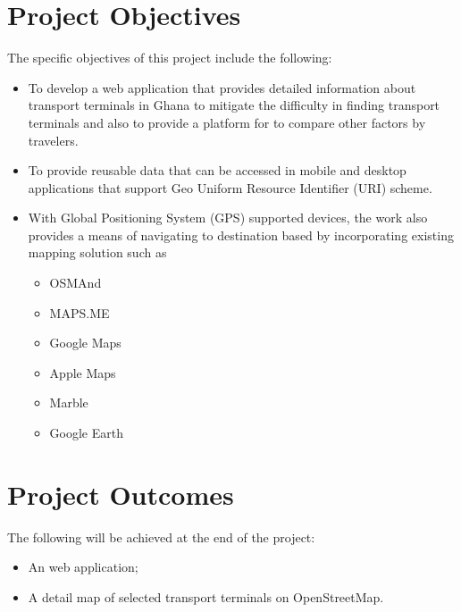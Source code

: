 \section{Project Objectives}
The specific objectives of this project include the following:
\begin{itemize}
	\item To develop a web application that provides detailed information about transport terminals in Ghana to mitigate the difficulty in finding transport terminals and also to provide a platform for to compare other factors by travelers.
		\item To provide reusable data that can be accessed in mobile and desktop applications that support Geo Uniform Resource Identifier (URI) scheme.
		\item With Global Positioning System (GPS) supported devices, the work also provides a means of navigating to destination based by incorporating existing mapping solution such as
	    \begin{itemize}[label=$\circ$]
		\item OSMAnd
		\item MAPS.ME
		\item Google Maps
		\item Apple Maps
		\item Marble
		\item Google Earth
		\end{itemize}
\end{itemize}

\section{Project Outcomes}
The following will be achieved at the end of the project:
\begin{itemize}
	\item An web application;
	\item A detail map of selected transport terminals on OpenStreetMap.
\end{itemize}


